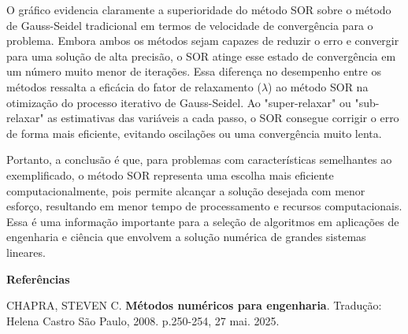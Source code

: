 \documentclass[12pt,a4paper,openany,oneside]{abntex2}
\begin{document}
O gráfico evidencia claramente a superioridade do método SOR sobre o método de Gauss-Seidel tradicional em termos de velocidade de convergência para o problema. Embora ambos os métodos sejam capazes de reduzir o erro e convergir para uma solução de alta precisão, o SOR atinge esse estado de convergência em um 
número muito menor de iterações. Essa diferença no desempenho entre os métodos ressalta a eficácia do fator de relaxamento ($\lambda$) ao método SOR na otimização do processo iterativo de Gauss-Seidel. Ao "super-relaxar" ou "sub-relaxar" as estimativas das variáveis a cada passo, o SOR consegue corrigir o 
erro de forma mais eficiente, evitando oscilações ou uma convergência muito lenta.

Portanto, a conclusão é que, para problemas com características semelhantes ao exemplificado, 
o método SOR representa uma escolha mais eficiente computacionalmente, pois permite alcançar 
a solução desejada com menor esforço, resultando em menor tempo de processamento e recursos 
computacionais. Essa é uma informação importante para a seleção de algoritmos em 
aplicações de engenharia e ciência que envolvem a solução numérica de grandes sistemas lineares.

\newpage
\begin{center}
    \textbf{\large Referências}
\end{center}

\setlength{\parindent}{0pt}
CHAPRA, STEVEN C. \textbf{Métodos numéricos para engenharia}. Tradução: Helena Castro
São Paulo, 2008. p.250-254, 27 mai. 2025.
\end{document}

